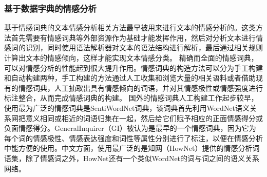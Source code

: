 \documentclass[cs4size,a4paper]{ctexart}
\numberwithin{equation}{section}
\numberwithin{table}{section}
\numberwithin{figure}{section}
\begin{document}
\subsubsection{基于数据字典的情感分析}

基于情感词典的文本情感分析相关方法最早被用来进行文本的情感分析的。这类方法首先需要有情感词典等外部资源作为基础才能发挥作用，然后对分析文本进行情感词的识别，同时使用语法解析器对文本的语法结构进行解析，最后通过相关规则计算出文本的情感倾向，这样才能实现文本情感分类。
精确而全面的情感词典，可以对情感分析的性能起到很大提升作用。情感词典的构造方法可以分为手工构建和自动构建两种，手工构建的方法通过人工收集和浏览大量的相关语料或者借助现有的情感词典，人工抽取出具有情感倾向的词语，并对其情感极性或情感强度进行标注整合，从而完成情感词典的构建。
国外的情感词典人工构建工作起步较早，使用最为广泛的情感词典是SentiWordNet词典，该词典首先利用WordNet语义关系网把意义相同或相近的词语归集在一起，然后给它们赋予相应的正面情感得分或负面情感得分。GeneralInquirer（GI）被认为是最早的一个情感词典，因为它为每个词的情感极性、情感表达强度和词性等属性分别进行了标注，以便在情感分析中能方便的使用。中文方面，使用最广泛的是知网（HowNet）提供的情感分析词语集，除了情感词之外，HowNet还有一个类似WordNet的词与词之间的语义关系网络。

 \begin{table}
  \centering
  \caption{股票情感词}\label{tb:sentiment}

\end{table}
\end{document}
